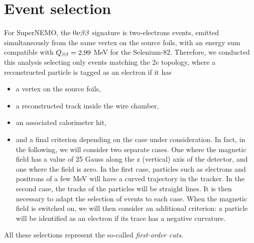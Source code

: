 \section{Event selection}
\label{sec:sensitivity_ev_selection}

For SuperNEMO, the $0\nu\beta\beta$ signature is two-electrons events, emitted simultaneously from the same vertex on the source foils, with an energy sum compatible with $Q_{\beta\beta} = 2.99$ MeV for the Selenium-$82$.
Therefore, we conducted this analysis selecting only events matching the $2e$ topology, where a reconstructed particle is tagged as an electron if it has
\begin{itemize}
\item a vertex on the source foils,
\item a reconstructed track inside the wire chamber,
\item an associated calorimeter hit,
\item and a final criterion depending on the case under consideration.
  In fact, in the following, we will consider two separate cases.
  One where the magnetic field has a value of 25 Gauss along the z (vertical) axis of the detector, and one where the field is zero.
  In the first case, particles such as electrons and positrons of a few MeV will have a curved trajectory in the tracker.
  In the second case, the tracks of the particles will be straight lines.
  It is then necessary to adapt the selection of events to each case. When the magnetic field is switched on, we will then consider an additional criterion: a particle will be identified as an electron if its trace has a negative curvature.
\end{itemize}
All these selections represent the so-called \emph{first-order cuts}.


